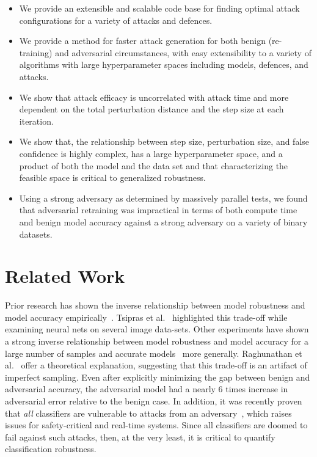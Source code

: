 \documentclass[fonts]{icst}
\begin{document}
\begin{itemize}

    \item We provide an extensible and scalable code base for finding optimal attack configurations for a variety of attacks and defences.

    \item  We provide a method for faster attack generation for both benign (re-training) and adversarial circumstances, with easy extensibility to a variety of algorithms with large hyperparameter spaces including  models, defences, and attacks.

    \item We show that attack efficacy is uncorrelated with attack time and more dependent on the total perturbation distance and the step size at each iteration.

    \item We show that, the relationship between step size, perturbation size, and false confidence is highly complex, has a large hyperparameter space, and a product of both the model and the data set and that characterizing the feasible space is critical to generalized robustness.

    \item Using a strong adversary as determined by massively parallel tests, we found that adversarial retraining was impractical in terms of both compute time and benign model accuracy against a strong adversary on a variety of binary datasets.

\end{itemize}

\section{Related Work}

Prior research has shown the inverse relationship between model robustness and model accuracy empirically~\cite{li2016general,tsipras2018robustness}.
Tsipras et al.~\cite{tsipras2018robustness} highlighted this trade-off while examining neural nets on several image data-sets.
Other experiments have shown a strong inverse relationship between model robustness and model accuracy for a large number of samples and accurate models~\cite{raghunathan2020understanding} more generally.
Raghunathan et al.~\cite{raghunathan2020understanding} offer a theoretical explanation, suggesting that this trade-off is an artifact of imperfect sampling.
Even after explicitly minimizing the gap between benign and adversarial accuracy, the adversarial model had a nearly 6 times increase in adversarial error relative to the benign case.
In addition, it was recently proven that \textit{all} classifiers are vulnerable to attacks from an adversary~\cite{dohmatob2019generalized}, which raises issues for safety-critical and real-time systems.
Since all classifiers are doomed to fail against such attacks, then, at the very least, it is critical to quantify classification robustness.
\end{document}
